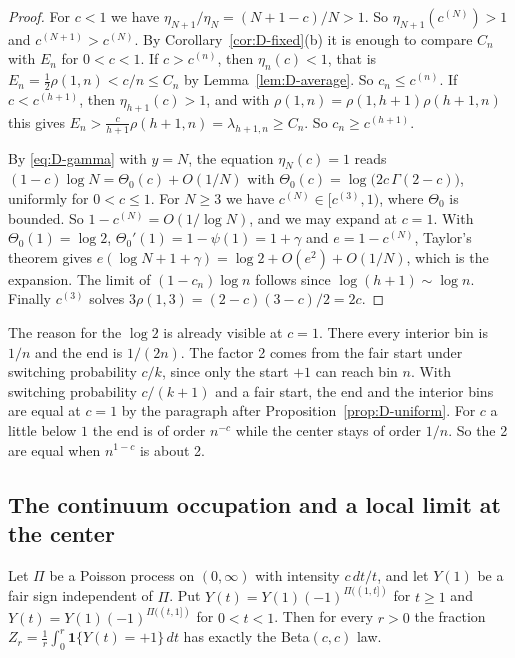 \begin{proof}
For $c<1$ we have $\eta_{N+1}/\eta_N=(N+1-c)/N>1$. So $\eta_{N+1}(c^{(N)})>1$ and
$c^{(N+1)}>c^{(N)}$. By Corollary~\ref{cor:D-fixed}(b) it is enough to compare $C_n$ with $E_n$
for $0<c<1$. If $c>c^{(n)}$, then $\eta_n(c)<1$, that is $E_n=\frac12\rho(1,n)<c/n\le C_n$ by
Lemma~\ref{lem:D-average}. So $c_n\le c^{(n)}$. If $c<c^{(h+1)}$, then $\eta_{h+1}(c)>1$, and
with $\rho(1,n)=\rho(1,h+1)\rho(h+1,n)$ this gives
$E_n>\frac{c}{h+1}\rho(h+1,n)=\lambda_{h+1,n}\ge C_n$. So $c_n\ge c^{(h+1)}$.

By \eqref{eq:D-gamma} with $y=N$, the equation $\eta_N(c)=1$ reads
$(1-c)\log N=\Theta_0(c)+O(1/N)$ with $\Theta_0(c)=\log\bigl(2c\,\Gamma(2-c)\bigr)$, uniformly
for $0<c\le1$. For $N\ge3$ we have $c^{(N)}\in[c^{(3)},1)$, where $\Theta_0$ is bounded. So
$1-c^{(N)}=O(1/\log N)$, and we may expand at $c=1$. With $\Theta_0(1)=\log2$,
$\Theta_0'(1)=1-\psi(1)=1+\gamma$ and $e=1-c^{(N)}$, Taylor's theorem gives
$e(\log N+1+\gamma)=\log2+O(e^2)+O(1/N)$, which is the expansion. The limit of
$(1-c_n)\log n$ follows since $\log(h+1)\sim\log n$. Finally $c^{(3)}$ solves
$3\rho(1,3)=(2-c)(3-c)/2=2c$.
\end{proof}

The reason for the $\log2$ is already visible at $c=1$. There every interior bin is $1/n$ and
the end is $1/(2n)$. The factor 2 comes from the fair start under switching probability $c/k$,
since only the start $+1$ can reach bin $n$. With switching probability $c/(k+1)$ and a fair
start, the end and the interior bins are equal at $c=1$ by the paragraph after
Proposition~\ref{prop:D-uniform}. For $c$ a little below $1$ the end is of order $n^{-c}$ while the center stays of
order $1/n$. So the 2 are equal when $n^{1-c}$ is about 2.

\subsection{The continuum occupation and a local limit at the center}

\begin{proposition}\label{prop:D-beta}
Let $\Pi$ be a Poisson process on $(0,\infty)$ with intensity $c\,dt/t$, and let $Y(1)$ be a
fair sign independent of $\Pi$. Put $Y(t)=Y(1)(-1)^{\Pi((1,t])}$ for $t\ge1$ and
$Y(t)=Y(1)(-1)^{\Pi((t,1])}$ for $0<t<1$. Then for every $r>0$ the fraction
$Z_r=\frac1r\int_0^r\mathbf 1\{Y(t)=+1\}\,dt$ has exactly the Beta$(c,c)$ law.
\end{proposition}

